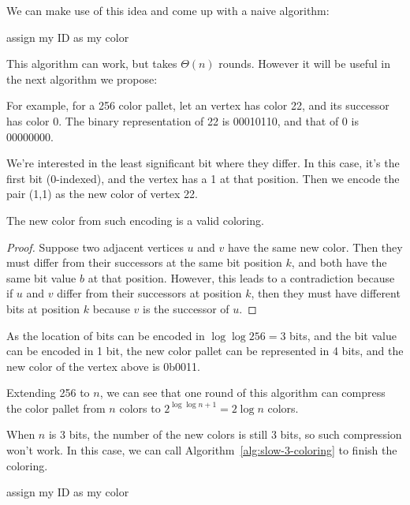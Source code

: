 We can make use of this idea and come up with a naive algorithm:

\begin{algorithm}[H]
	assign my ID as my color\;
	\caption{Slow Deterministic 3-coloring Algorithm Using IDs} \label{alg:slow-3-coloring}
\end{algorithm}

This algorithm can work, but takes $\Theta(n)$ rounds. However it will be useful in the next algorithm we propose:

For example, for a 256 color pallet, let an vertex has color 22, and its successor has color 0. The binary representation of 22 is 00010110, and that of 0 is 00000000.

We're interested in the least significant bit where they differ. In this case, it's the first bit (0-indexed), and the vertex has a 1 at that position. Then we encode the pair (1,1) as the new color of vertex 22.

\begin{lemma}
	The new color from such encoding is a valid coloring.
\end{lemma}
\begin{proof}
	Suppose two adjacent vertices $u$ and $v$ have the same new color. Then they must differ from their successors at the same bit position $k$, and both have the same bit value $b$ at that position. However, this leads to a contradiction because if $u$ and $v$ differ from their successors at position $k$, then they must have different bits at position $k$ because $v$ is the successor of $u$.
\end{proof}

As the location of bits can be encoded in $\log \log 256 = 3$ bits, and the bit value can be encoded in 1 bit, the new color pallet can be represented in 4 bits, and the new color of the vertex above is 0b0011.

Extending 256 to $n$, we can see that one round of this algorithm can compress the color pallet from $n$ colors to $2^{\log\log n + 1} = 2\log n$ colors.

When $n$ is 3 bits, the number of the new colors is still 3 bits, so such compression won't work. In this case, we can call Algorithm~\ref{alg:slow-3-coloring} to finish the coloring.

\begin{algorithm}[H]
	assign my ID as my color\;
	\caption{Deterministic 3-coloring Algorithm} \label{alg:det-3-coloring}
\end{algorithm}

